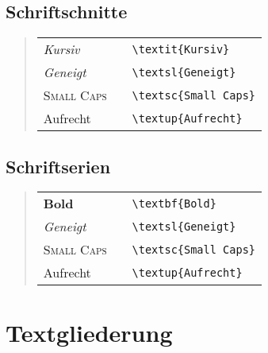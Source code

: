 \subsection{Schriftschnitte}
%
\begin{quote}
\begin{tabular}{lcl}
\textit{Kursiv}     & & \verb!\textit{Kursiv}!\\
\textsl{Geneigt}	& & \verb!\textsl{Geneigt}!\\
\textsc{Small Caps} & & \verb!\textsc{Small Caps}!\\
\textup{Aufrecht}   & & \verb!\textup{Aufrecht}!\\
\end{tabular}
\end{quote}
%

\subsection{Schriftserien}
%
\begin{quote}
\begin{tabular}{lcl}
\textbf{Bold}       & & \verb!\textbf{Bold}!\\
\textsl{Geneigt}	& & \verb!\textsl{Geneigt}!\\
\textsc{Small Caps} & & \verb!\textsc{Small Caps}!\\
\textup{Aufrecht}   & & \verb!\textup{Aufrecht}!\\
\end{tabular}
\end{quote}
%

\section{Textgliederung}
\label{sec:ueberschriften}

